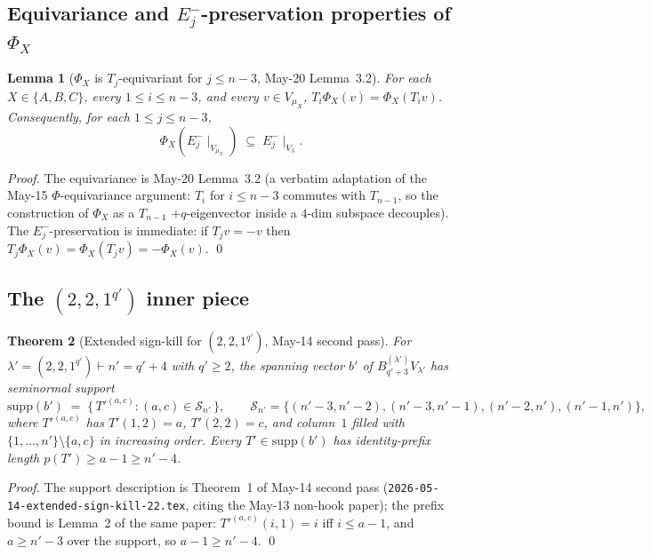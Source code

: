 \documentclass[11pt]{article}
\newtheorem{theorem}{Theorem}
\newtheorem{lemma}[theorem]{Lemma}
\theoremstyle{definition}
\newcommand{\supp}{\mathrm{supp}}
\begin{document}
\subsection{Equivariance and $E_j^-$-preservation properties of $\Phi_X$}

\begin{lemma}[$\Phi_X$ is $T_j$-equivariant for $j \le n-3$, May-20 Lemma~3.2]\label{lem:Phi-equiv}
For each $X \in \{A, B, C\}$, every $1 \le i \le n-3$, and every
$v \in V_{\mu_X}$,
$T_i \Phi_X(v) = \Phi_X(T_i v)$.  Consequently, for each
$1 \le j \le n-3$,
\[
   \Phi_X\!\left(E_j^-\!\mid_{V_{\mu_X}}\right)
   \;\subseteq\; E_j^-\!\mid_{V_\lambda}.
\]
\end{lemma}

\begin{proof}
The equivariance is May-20 Lemma~3.2 (a verbatim adaptation of the
May-15 $\Phi$-equivariance argument: $T_i$ for $i \le n-3$ commutes
with $T_{n-1}$, so the construction of $\Phi_X$ as a $T_{n-1}$
$+q$-eigenvector inside a $4$-dim subspace decouples).  The
$E_j^-$-preservation is immediate: if $T_j v = -v$ then
$T_j \Phi_X(v) = \Phi_X(T_j v) = -\Phi_X(v)$.
\qed
\end{proof}

\subsection{The $(2,2,1^{q'})$ inner piece}

\begin{theorem}[Extended sign-kill for $(2, 2, 1^{q'})$, May-14 second pass]\label{thm:22-extended}
For $\lambda' = (2, 2, 1^{q'}) \vdash n' = q' + 4$ with $q' \ge 2$, the
spanning vector $b'$ of $B^{(\lambda')}_{q'+3} V_{\lambda'}$ has
seminormal support
\[
   \supp(b') \;=\; \{\,T'^{(a, c)} : (a, c) \in \mathcal{S}_{n'}\,\},
   \qquad
   \mathcal{S}_{n'} = \{(n'{-}3, n'{-}2), (n'{-}3, n'{-}1),
   (n'{-}2, n'), (n'{-}1, n')\},
\]
where $T'^{(a, c)}$ has $T'(1, 2) = a$, $T'(2, 2) = c$, and
column~$1$ filled with $\{1, \ldots, n'\} \setminus \{a, c\}$ in
increasing order.  Every $T' \in \supp(b')$ has identity-prefix
length $p(T') \ge a - 1 \ge n' - 4$.
\end{theorem}

\begin{proof}
The support description is Theorem~1 of May-14 second pass
(\texttt{2026-05-14-extended-sign-kill-22.tex}, citing the May-13
non-hook paper); the prefix bound is Lemma~2 of the same paper:
$T'^{(a, c)}(i, 1) = i$ iff $i \le a - 1$, and $a \ge n' - 3$ over
the support, so $a - 1 \ge n' - 4$.
\qed
\end{proof}
\end{document}
